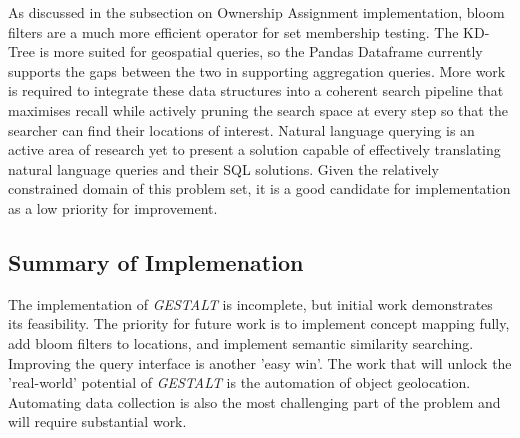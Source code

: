 As discussed in the subsection on Ownership Assignment implementation, bloom filters are a much more efficient operator for set membership testing. 
The KD-Tree is more suited for geospatial queries, so the Pandas Dataframe currently supports the gaps between the two in supporting aggregation queries. More work is required to integrate these data structures into a coherent search pipeline that maximises recall while actively pruning the search space at every step so that the searcher can find their locations of interest. Natural language querying is an active area of research yet to present a solution capable of effectively translating natural language queries and their SQL solutions. Given the relatively constrained domain of this problem set, it is a good candidate for implementation as a low priority for improvement. 

\subsection{Summary of Implemenation}
The implementation of \textit{GESTALT} is incomplete, but initial work demonstrates its feasibility. The priority for future work is to implement concept mapping fully, add bloom filters to locations, and implement semantic similarity searching. Improving the query interface is another 'easy win'. The work that will unlock the 'real-world' potential of \textit{GESTALT} is the automation of object geolocation. Automating data collection is also the most challenging part of the problem and will require substantial work. 
